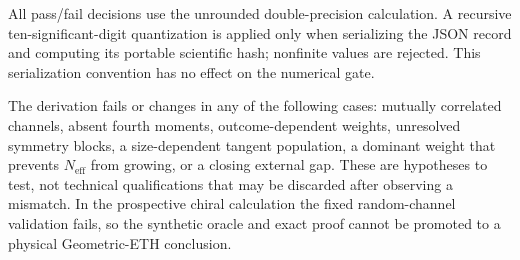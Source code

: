 All pass/fail decisions use the unrounded double-precision calculation.  A
recursive ten-significant-digit quantization is applied only when serializing
the JSON record and computing its portable scientific hash; nonfinite values
are rejected.  This serialization convention has no effect on the numerical
gate.

The derivation fails or changes in any of the following cases: mutually
correlated channels, absent fourth moments, outcome-dependent weights,
unresolved symmetry blocks, a size-dependent tangent population, a dominant
weight that prevents $N_{\mathrm{eff}}$ from growing, or a closing external
gap.  These are hypotheses to test, not technical qualifications that may be
discarded after observing a mismatch.  In the prospective chiral calculation
the fixed random-channel validation fails, so the synthetic oracle and exact
proof cannot be promoted to a physical Geometric-ETH conclusion.
